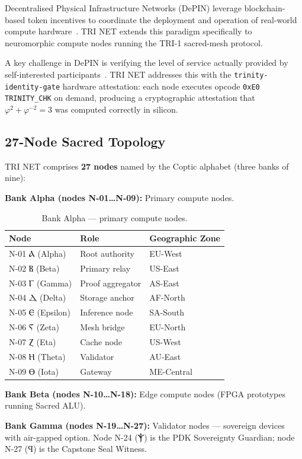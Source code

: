 Decentralised Physical Infrastructure Networks (DePIN) leverage blockchain-based
token incentives to coordinate the deployment and operation of real-world compute
hardware~\cite{lin2024depin}.
TRI NET extends this paradigm specifically to neuromorphic compute nodes running
the TRI-1 sacred-mesh protocol.

A key challenge in DePIN is verifying the level of service actually provided by
self-interested participants~\cite{milionis2025incentive}.
TRI NET addresses this with the \texttt{trinity-identity-gate} hardware
attestation: each node executes opcode \texttt{0xE0 TRINITY\_CHK} on demand,
producing a cryptographic attestation that
\(\varphi^2 + \varphi^{-2} = 3\) was computed correctly in silicon.

\subsection{27-Node Sacred Topology}

TRI NET comprises \textbf{27 nodes} named by the Coptic alphabet
(three banks of nine):

\textbf{Bank Alpha (nodes N-01\ldots N-09):} Primary compute nodes.

\begin{table}[h]
\centering
\caption{Bank Alpha — primary compute nodes.}
\label{tab:bank-alpha}
\begin{tabular}{lll}
\hline
Node & Role & Geographic Zone \\
\hline
N-01 Ⲁ (Alpha) & Root authority & EU-West \\
N-02 Ⲃ (Beta) & Primary relay & US-East \\
N-03 Ⲅ (Gamma) & Proof aggregator & AS-East \\
N-04 Ⲇ (Delta) & Storage anchor & AF-North \\
N-05 Ⲉ (Epsilon) & Inference node & SA-South \\
N-06 Ⲋ (Zeta) & Mesh bridge & EU-North \\
N-07 Ⲍ (Eta) & Cache node & US-West \\
N-08 Ⲏ (Theta) & Validator & AU-East \\
N-09 Ⲑ (Iota) & Gateway & ME-Central \\
\hline
\end{tabular}
\end{table}

\textbf{Bank Beta (nodes N-10\ldots N-18):} Edge compute nodes (FPGA prototypes
running Sacred ALU).

\textbf{Bank Gamma (nodes N-19\ldots N-27):} Validator nodes — sovereign devices
with air-gapped option.
Node N-24 (Ⲯ) is the PDK Sovereignty Guardian; node N-27 (Ϥ) is the Capstone
Seal Witness.

